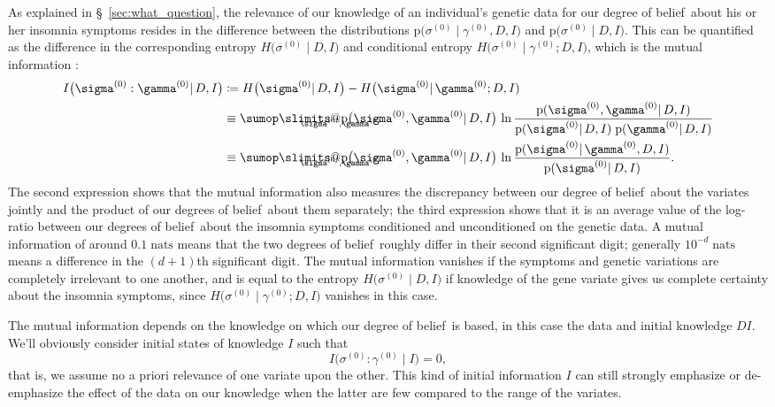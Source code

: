 \documentclass[\ifafour a4paper,12pt,\else a5paper,10pt,\fi%
onecolumn,oneside,article,%
british%
]{memoir}
\makeatletter
\theoremstyle{remark}
\theoremstyle{innote}
\def\sum{\DOTSI\sumop\slimits@}
\newcommand*{\citep}{\parencites}
\newcommand*{\defd}{\coloneqq}
\newcommand*{\pf}{\mathrm{p}}%
\renewcommand*{\|}{\mathpunct{|}}
\newcommand*{\sect}{\S}%
\newcommand*{\chap}{ch.}%
\newcommand*{\dob}{degree of belief}
\newcommand*{\dobs}{degrees of belief}
\newcommand*{\yD}{D}
\newcommand*{\yI}{I}
\newcommand*{\sH}{H}
\newcommand*{\mI}{I}
\newcommand*{\ys}{\sigma}
\newcommand*{\yg}{\gamma}
\newcommand*{\ysi}[1]{\ys^{(#1)}}
\newcommand*{\ygi}[1]{\yg^{(#1)}}
\newcommand*{\yso}{\ysi{0}}
\newcommand*{\ygo}{\ygi{0}}
\makeatother
\begin{document}
As explained in \sect~\ref{sec:what_question}, the relevance of our
knowledge of an individual's genetic data for our \dob\ about his or her
insomnia symptoms resides in the difference between the distributions
$\pf\bigl(\yso\| \ygo, \yD, \yI\bigr)$ and
$\pf\bigl(\yso \| \yD, \yI\bigr)$. This can be quantified as the difference
in the corresponding entropy $\sH\bigl(\yso \| \yD,\yI\bigr)$
and conditional entropy
$\sH\bigl(\yso \| \ygo; \yD,\yI)$, which is the
mutual information \citep[in these called
\enquote{rate of
  transmission}]{shannon1948,kelly1956}[\sect~14.7]{pressetal1988_r2007}[\chap~2]{coveretal1991_r2006}:
\begin{equation}
  \label{eq:mutual_info_new_ind}
  \begin{split}
  \mI\bigl( \ysi{0} : \ygi{0} \| \yD,\yI \bigr) &\defd
  \sH\bigl(\yso \| \yD,\yI\bigr) -
  \sH\bigl(\yso \| \ygo; \yD,\yI)
  \\
  &\equiv
  \sum_{\mathclap{\ysi{0},\ygi{0}}} \pf\bigl(\ysi{0}, \ygi{0} \| \yD, \yI\bigr)
 \, \ln\frac{\pf(\ysi{0}, \ygi{0} \| \yD, \yI)}{
    \pf(\ysi{0} \| \yD, \yI)\;
    \pf(\ygi{0} \| \yD, \yI)}
  \\
  &\equiv
  \sum_{\mathclap{\ysi{0},\ygi{0}}} \pf\bigl(\ysi{0}, \ygi{0} \| \yD, \yI\bigr)
 \, \ln\frac{\pf(\ysi{0}\| \ygi{0}, \yD, \yI)}{
    \pf(\ysi{0} \| \yD, \yI)}.
\end{split}
\end{equation}
The second expression shows that the mutual information also measures the
discrepancy between our \dob\ about the variates jointly and the product of
our \dobs\ about them separately; the third expression shows that it is an
average value of the log-ratio between our \dobs\ about the insomnia
symptoms conditioned and unconditioned on the genetic data. A mutual
information of around $0.1\;\textrm{nats}$ means that the two \dobs\
roughly differ in their second significant digit; generally
$10^{-d}\;\textrm{nats}$ means a difference in the $(d+1)$th significant
digit. The mutual information vanishes if the symptoms and genetic
variations are completely irrelevant to one another, and is equal to the
entropy $\sH\bigl(\yso \|
\yD,\yI\bigr)$ %
if knowledge of the gene variate gives us complete certainty about the
insomnia symptoms, since $\sH\bigl(\yso \| \ygo; \yD,\yI)$ vanishes in this
case.


The mutual information depends on the knowledge on which our \dob\ is
based, in this case the data and initial knowledge $\yD\yI$. We'll
obviously consider initial states of knowledge $\yI$ such that
\begin{equation}
\mI\bigl( \ysi{0} : \ygi{0} \| \yI \bigr) =0,
\end{equation}
that is, we assume no a priori relevance of one variate upon the other.
This kind of initial information $\yI$ can still strongly emphasize or
de-emphasize the effect of the data on our knowledge when the latter are
few compared to the range of the variates.
\end{document}
